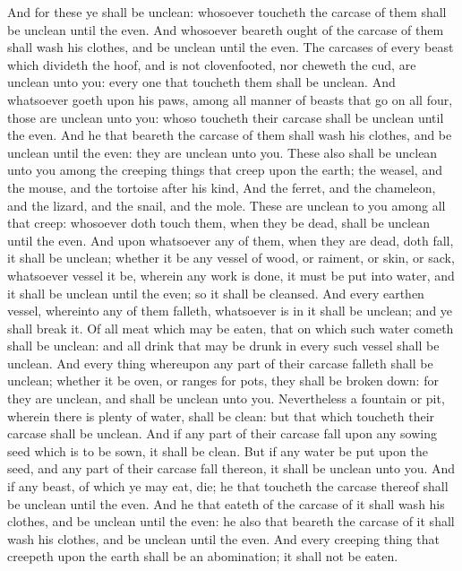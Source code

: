 \begin{biblechapter}
\verse And for these ye shall be unclean: whosoever toucheth the carcase of them shall be unclean until the even.
\verse And whosoever beareth ought of the carcase of them shall wash his clothes, and be unclean until the even.
\verse The carcases of every beast which divideth the hoof, and is not clovenfooted, nor cheweth the cud, are unclean unto you: every one that toucheth them shall be unclean.
\verse And whatsoever goeth upon his paws, among all manner of beasts that go on all four, those are unclean unto you: whoso toucheth their carcase shall be unclean until the even.
\verse And he that beareth the carcase of them shall wash his clothes, and be unclean until the even: they are unclean unto you.
\verse These also shall be unclean unto you among the creeping things that creep upon the earth; the weasel, and the mouse, and the tortoise after his kind,
\verse And the ferret, and the chameleon, and the lizard, and the snail, and the mole.
\verse These are unclean to you among all that creep: whosoever doth touch them, when they be dead, shall be unclean until the even.
\verse And upon whatsoever any of them, when they are dead, doth fall, it shall be unclean; whether it be any vessel of wood, or raiment, or skin, or sack, whatsoever vessel it be, wherein any work is done, it must be put into water, and it shall be unclean until the even; so it shall be cleansed.
\verse And every earthen vessel, whereinto any of them falleth, whatsoever is in it shall be unclean; and ye shall break it.
\verse Of all meat which may be eaten, that on which such water cometh shall be unclean: and all drink that may be drunk in every such vessel shall be unclean.
\verse And every thing whereupon any part of their carcase falleth shall be unclean; whether it be oven, or ranges for pots, they shall be broken down: for they are unclean, and shall be unclean unto you.
\verse Nevertheless a fountain or pit, wherein there is plenty of water, shall be clean: but that which toucheth their carcase shall be unclean.
\verse And if any part of their carcase fall upon any sowing seed which is to be sown, it shall be clean.
\verse But if any water be put upon the seed, and any part of their carcase fall thereon, it shall be unclean unto you.
\verse And if any beast, of which ye may eat, die; he that toucheth the carcase thereof shall be unclean until the even.
\verse And he that eateth of the carcase of it shall wash his clothes, and be unclean until the even: he also that beareth the carcase of it shall wash his clothes, and be unclean until the even.
\verse And every creeping thing that creepeth upon the earth shall be an abomination; it shall not be eaten.

\end{biblechapter}
